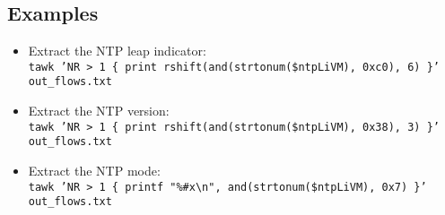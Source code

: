 \documentclass[documentation]{subfiles}
\begin{document}
\subsection{Examples}\label{ntp:examples}
\begin{itemize}
    \item Extract the NTP leap indicator:\\
          {\tt tawk 'NR > 1 \{ print rshift(and(strtonum(\$ntpLiVM), 0xc0), 6) \}' out\_flows.txt}
    \item Extract the NTP version:\\
          {\tt tawk 'NR > 1 \{ print rshift(and(strtonum(\$ntpLiVM), 0x38), 3) \}' out\_flows.txt}
    \item Extract the NTP mode:\\
            {\tt tawk 'NR > 1 \{ printf "\%\#x\textbackslash{}n", and(strtonum(\$ntpLiVM), 0x7) \}' out\_flows.txt}
\end{itemize}
\end{document}
